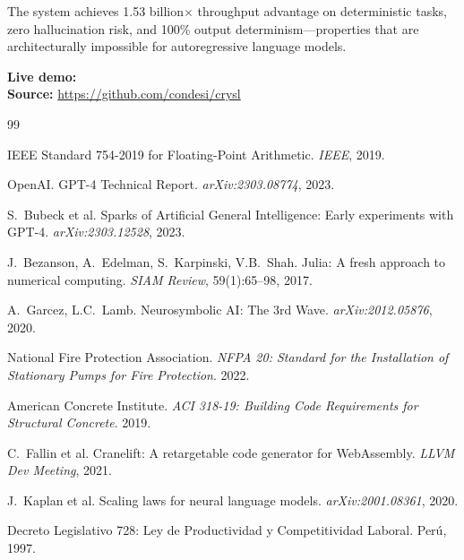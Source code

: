 \documentclass[11pt]{article}
\begin{document}
The system achieves 1.53 billion$\times$ throughput advantage on deterministic tasks,
zero hallucination risk, and 100\% output determinism---properties that are
architecturally impossible for autoregressive language models.

\textbf{Live demo:}  \\
\textbf{Source:} \url{https://github.com/condesi/crysl}


\begin{thebibliography}{99}

IEEE Standard 754-2019 for Floating-Point Arithmetic.
\textit{IEEE}, 2019.

OpenAI.
GPT-4 Technical Report.
\textit{arXiv:2303.08774}, 2023.

S.~Bubeck et al.
Sparks of Artificial General Intelligence: Early experiments with GPT-4.
\textit{arXiv:2303.12528}, 2023.

J.~Bezanson, A.~Edelman, S.~Karpinski, V.B.~Shah.
Julia: A fresh approach to numerical computing.
\textit{SIAM Review}, 59(1):65--98, 2017.

A.~Garcez, L.C.~Lamb.
Neurosymbolic AI: The 3rd Wave.
\textit{arXiv:2012.05876}, 2020.

National Fire Protection Association.
\textit{NFPA 20: Standard for the Installation of Stationary Pumps for Fire Protection}.
2022.

American Concrete Institute.
\textit{ACI 318-19: Building Code Requirements for Structural Concrete}.
2019.

C.~Fallin et al.
Cranelift: A retargetable code generator for WebAssembly.
\textit{LLVM Dev Meeting}, 2021.

J.~Kaplan et al.
Scaling laws for neural language models.
\textit{arXiv:2001.08361}, 2020.

Decreto Legislativo 728: Ley de Productividad y Competitividad Laboral.
Per\'u, 1997.

\end{thebibliography}
\end{document}
